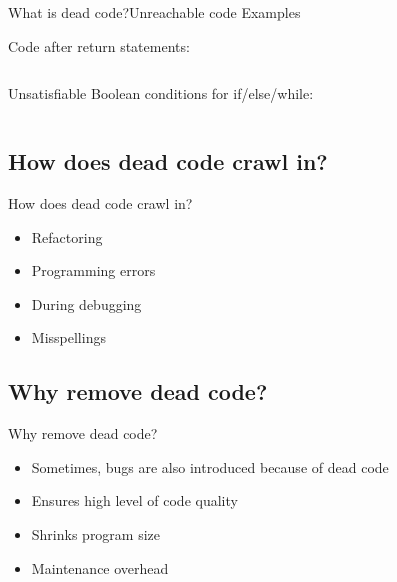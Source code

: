 \documentclass{beamer}
\begin{document}
\begin{frame}{What is dead code?}{Unreachable code Examples}
    \begin{example}{Code after return statements:}
        \inputminted{python}{content/code_after_return.py}
    \end{example}

    \begin{example}{Unsatisfiable Boolean conditions for if/else/while:}
        \inputminted{python}{content/unsatisfiable_conditions.py}
    \end{example}
\end{frame}


\subsection{How does dead code crawl in?}
\begin{frame}{How does dead code crawl in?}
    \begin{itemize}
        \item
            Refactoring
        \pause
        \item
            Programming errors
        \pause
        \item
            During debugging
        \pause
        \item
            Misspellings
    \end{itemize}    
\end{frame}

\subsection{Why remove dead code?}

\begin{frame}{Why remove dead code?}
  \begin{itemize}
  \item
    Sometimes, bugs are also introduced because of dead code
    \pause
  \item
    Ensures high level of code quality
    \pause
  \item
    Shrinks program size
    \pause
  \item
    Maintenance overhead
  \end{itemize}
\end{frame}
\end{document}
